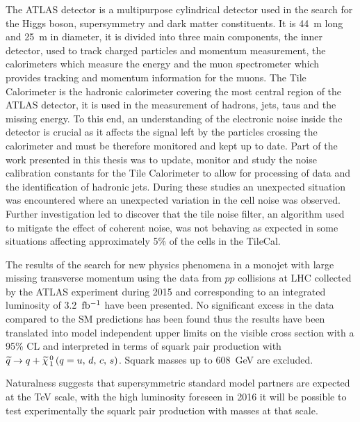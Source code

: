 The ATLAS detector is a multipurpose cylindrical detector used in the search for
the Higgs boson, supersymmetry and dark matter constituents. It is 44~m long and
25~m in diameter, it is divided into three main components, the inner detector,
used to track charged particles and momentum measurement, the calorimeters which
measure the energy and the muon spectrometer which provides tracking and
momentum information for the muons. The Tile Calorimeter is the hadronic
calorimeter covering the most central region of the ATLAS detector, it is used
in the measurement of hadrons, jets, taus and the missing energy. To this end,
an understanding of the electronic noise inside the detector is crucial as it
affects the signal left by the particles crossing the calorimeter and must be
therefore monitored and kept up to date. Part of the work presented in this
thesis was to update, monitor and study the noise calibration constants for the
Tile Calorimeter to allow for processing of data and the identification of
hadronic jets. During these studies an unexpected situation was encountered
where an unexpected variation in the cell noise was observed. Further
investigation led to discover that the tile noise filter, an algorithm used to
mitigate the effect of coherent noise, was not behaving as expected in some
situations affecting approximately 5\% of the cells in the TileCal.

The results of the search for new physics phenomena in a monojet with large
missing transverse momentum using the data from $pp$ collisions at LHC collected
by the ATLAS experiment during 2015 and corresponding to an integrated
luminosity of 3.2~$\mbox{fb$^{-1}$}$ have been presented. No significant excess in the data
compared to the SM predictions has been found thus the results have been
translated into model independent upper limits on the visible cross section with
a 95\% CL and interpreted in terms of squark pair production with
$\widetilde{q} \rightarrow q + \widetilde{\chi}_{\, 1}^{\, 0}\, (q = u,\, d,\, c,\, s)$. Squark masses up to 608~GeV are excluded.

Naturalness suggests that supersymmetric standard model partners are expected at
the TeV scale, with the high luminosity foreseen in 2016 it will be possible to
test experimentally the squark pair production with masses at that scale.
